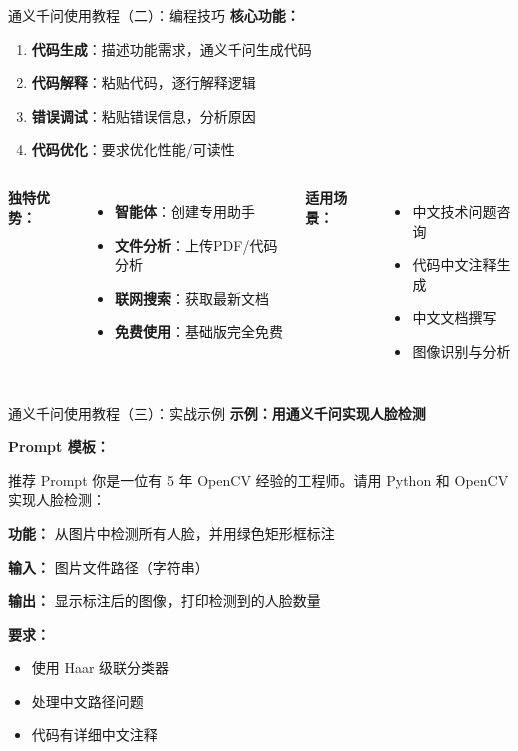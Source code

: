 \begin{frame}{通义千问使用教程（二）：编程技巧}
	\textbf{核心功能：}
	\begin{enumerate}
		\item \textbf{代码生成}：描述功能需求，通义千问生成代码
		\item \textbf{代码解释}：粘贴代码，逐行解释逻辑
		\item \textbf{错误调试}：粘贴错误信息，分析原因
		\item \textbf{代码优化}：要求优化性能/可读性
	\end{enumerate}

	\vspace{0.3cm}

	\begin{columns}
		\textbf{独特优势：}
		\begin{itemize}
			\item \textbf{智能体}：创建专用助手
			\item \textbf{文件分析}：上传PDF/代码分析
			\item \textbf{联网搜索}：获取最新文档
			\item \textbf{免费使用}：基础版完全免费
		\end{itemize}

		\textbf{适用场景：}
		\begin{itemize}
			\item 中文技术问题咨询
			\item 代码中文注释生成
			\item 中文文档撰写
			\item 图像识别与分析
		\end{itemize}
	\end{columns}
\end{frame}

\begin{frame}{通义千问使用教程（三）：实战示例}
	\textbf{示例：用通义千问实现人脸检测}

	\vspace{0.2cm}

	\textbf{Prompt 模板：}

	\begin{block}{推荐 Prompt}
		你是一位有 5 年 OpenCV 经验的工程师。请用 Python 和 OpenCV 实现人脸检测：

		\textbf{功能：} 从图片中检测所有人脸，并用绿色矩形框标注

		\textbf{输入：} 图片文件路径（字符串）

		\textbf{输出：} 显示标注后的图像，打印检测到的人脸数量

		\textbf{要求：}
		\begin{itemize}
			\item 使用 Haar 级联分类器
			\item 处理中文路径问题
			\item 代码有详细中文注释
		\end{itemize}
	\end{block}
\end{frame}

